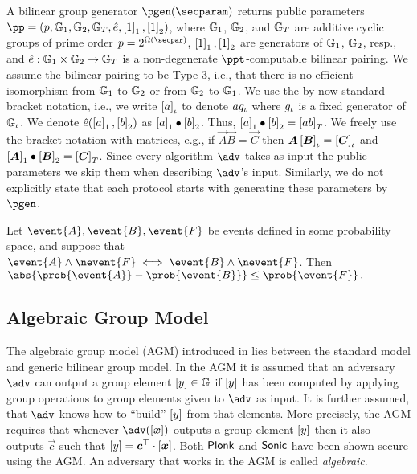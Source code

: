 A bilinear group generator $\pgen (\secparam)$ returns public parameters $ \pp =
(p, \GRP_1, \GRP_2, \GRP_T, \pair, \gone{1}, \gtwo{1})$, where $\mathbb{G}_1$,
$\mathbb{G}_2$, and $\mathbb{G}_T$ are additive cyclic groups of prime order $p = 2^{\Omega
  (\secpar)}$, $\left[1\right]_{1}, \left[1\right]_{2}$ are generators of $\mathbb{G}_1$, $\mathbb{G}_2$, resp.,
and $\hat{e}: \mathbb{G}_1 \times \mathbb{G}_2 \to \mathbb{G}_T$ is a non-degenerate
$\ppt$-computable bilinear pairing. We assume the bilinear pairing to be Type-3,
i.e., that there is no efficient isomorphism from $\mathbb{G}_1$ to $\mathbb{G}_2$ or from
$\mathbb{G}_2$ to $\mathbb{G}_1$. We use the by now standard bracket notation, i.e., we
write $\left[a\right]_{\iota}$ to denote $a g_{\iota}$ where $g_{\iota}$ is a fixed generator
of $\mathbb{G}_{\iota}$. We denote $\hat{e} (\left[a\right]_{1}, \left[b\right]_{2})$ as $\left[a\right]_{1} \bullet
\left[b\right]_{2}$. Thus, $\left[a\right]_{1} \bullet \left[b\right]_{2} = \left[a b\right]_{T}$. We freely use the
bracket notation with matrices, e.g., if $\vec{A} \vec{B} = \vec{C}$ then
$\vec{A} \grpgi{\vec{B}} = \grpgi{\vec{C}}$ and $\gone{\vec{A}}\bullet
\gtwo{\vec{B}} = \gtar{\vec{C}}$. Since every algorithm $\adv$ takes as input
the public parameters we skip them when describing $\adv$'s input. Similarly, we
do not explicitly state that each protocol starts with generating these
parameters by $\pgen$.

\begin{lemma}
	\label{lem:difference_lemma}
	Let $\event{A}, \event{B}, \event{F}$ be events defined in some probability
	space, and suppose that $\event{A} \land \nevent{F} \iff \event{B}
		\land \nevent{F}$.  Then 
	$
		\abs{\prob{\event{A}} - \prob{\event{B}}} \leq \prob{\event{F}}\,.
	$
\end{lemma}
\subsection{Algebraic Group Model}
The algebraic group model (AGM) introduced in \cite{C:FucKilLos18} lies between
the standard model and generic bilinear group model. In the AGM it is assumed
that an adversary $\adv$ can output a group element $\left[y\right] \in \mathbb{G}$ if
$\left[y\right]$ has been computed by applying group operations to group elements
given to $\adv$ as input. It is further assumed, that $\adv$ knows how to
``build'' $\left[y\right]$ from that elements. More precisely, the AGM requires that
whenever $\adv(\gnone{\vec{x}})$ outputs a group element $\left[y\right]$ then it
also outputs $\vec{c}$ such that $\gnone{y} = \vec{c}^\top \cdot
\gnone{\vec{x}}$. Both $\textnormal{\textsf{Plonk}}$ and ${\textnormal{\textsf{Sonic}}}$ have been shown secure using the
AGM. An adversary that works in the AGM is called \emph{algebraic}.

